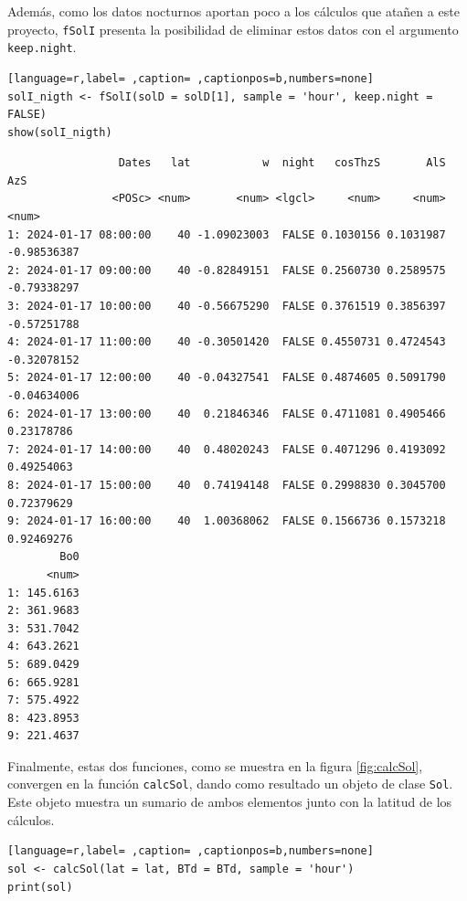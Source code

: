 Además, como los datos nocturnos aportan poco a los cálculos que atañen a este proyecto, \texttt{fSolI} presenta la posibilidad de eliminar estos datos con el argumento \texttt{keep.night}.
\begin{lstlisting}[language=r,label= ,caption= ,captionpos=b,numbers=none]
solI_nigth <- fSolI(solD = solD[1], sample = 'hour', keep.night = FALSE)
show(solI_nigth)
\end{lstlisting}

\begin{verbatim}
                 Dates   lat           w  night   cosThzS       AlS         AzS
                <POSc> <num>       <num> <lgcl>     <num>     <num>       <num>
1: 2024-01-17 08:00:00    40 -1.09023003  FALSE 0.1030156 0.1031987 -0.98536387
2: 2024-01-17 09:00:00    40 -0.82849151  FALSE 0.2560730 0.2589575 -0.79338297
3: 2024-01-17 10:00:00    40 -0.56675290  FALSE 0.3761519 0.3856397 -0.57251788
4: 2024-01-17 11:00:00    40 -0.30501420  FALSE 0.4550731 0.4724543 -0.32078152
5: 2024-01-17 12:00:00    40 -0.04327541  FALSE 0.4874605 0.5091790 -0.04634006
6: 2024-01-17 13:00:00    40  0.21846346  FALSE 0.4711081 0.4905466  0.23178786
7: 2024-01-17 14:00:00    40  0.48020243  FALSE 0.4071296 0.4193092  0.49254063
8: 2024-01-17 15:00:00    40  0.74194148  FALSE 0.2998830 0.3045700  0.72379629
9: 2024-01-17 16:00:00    40  1.00368062  FALSE 0.1566736 0.1573218  0.92469276
        Bo0
      <num>
1: 145.6163
2: 361.9683
3: 531.7042
4: 643.2621
5: 689.0429
6: 665.9281
7: 575.4922
8: 423.8953
9: 221.4637
\end{verbatim}

Finalmente, estas dos funciones, como se muestra en la figura \ref{fig:calcSol}, convergen en la función \texttt{calcSol}, dando como resultado un objeto de clase \texttt{Sol}. Este objeto muestra un sumario de ambos elementos junto con la latitud de los cálculos.
\begin{lstlisting}[language=r,label= ,caption= ,captionpos=b,numbers=none]
sol <- calcSol(lat = lat, BTd = BTd, sample = 'hour')
print(sol)
\end{lstlisting}

